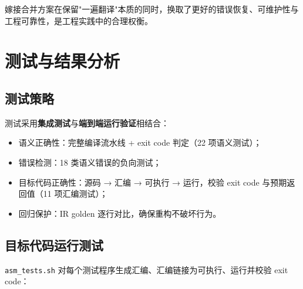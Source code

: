 \documentclass[12pt,a4paper]{ctexart}
\begin{document}
嫁接合并方案在保留"一遍翻译"本质的同时，换取了更好的错误恢复、可维护性与工程可靠性，是工程实践中的合理权衡。

\newpage

\section{测试与结果分析}

\subsection{测试策略}

测试采用\textbf{集成测试}与\textbf{端到端运行验证}相结合：
\begin{itemize}
    \item 语义正确性：完整编译流水线 + exit code 判定（22 项语义测试）；
    \item 错误检测：18 类语义错误的负向测试；
    \item 目标代码正确性：源码 → 汇编 → 可执行 → 运行，校验 exit code 与预期返回值（11 项汇编测试）；
    \item 回归保护：IR golden 逐行对比，确保重构不破坏行为。
\end{itemize}

\subsection{目标代码运行测试}

\texttt{asm\_tests.sh} 对每个测试程序生成汇编、汇编链接为可执行、运行并校验 exit code：
\end{document}
